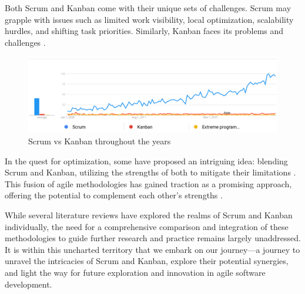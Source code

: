 \documentclass[conference]{IEEEtran}
\begin{document}
Both Scrum and Kanban come with their unique sets of challenges. Scrum may grapple with issues such as limited work visibility, local optimization, scalability hurdles, and shifting task priorities. Similarly, Kanban faces its problems and challenges \cite{ahmad2016transition}.

\begin{figure}[]
    \centering
    \includegraphics[width=0.8\linewidth]{trends.png}
    \caption{Scrum vs Kanban throughout the years}
    \label{fig: Trend for Scrum vs Kanban}
\end{figure}

In the quest for optimization, some have proposed an intriguing idea: blending Scrum and Kanban, utilizing the strengths of both to mitigate their limitations \cite{ladas2009scrumban}. This fusion of agile methodologies has gained traction as a promising approach, offering the potential to complement each other's strengths \cite{reddy2015scrumban}.

While several literature reviews have explored the realms of Scrum \cite{cho2010exploratory, faniran2017adopting} and Kanban \cite{kirovska2015usage, ahmad2013kanban, ahmad2018kanban} individually, the need for a comprehensive comparison and integration of these methodologies to guide further research and practice remains largely unaddressed. It is within this uncharted territory that we embark on our journey—a journey to unravel the intricacies of Scrum and Kanban, explore their potential synergies, and light the way for future exploration and innovation in agile software development.
\end{document}
